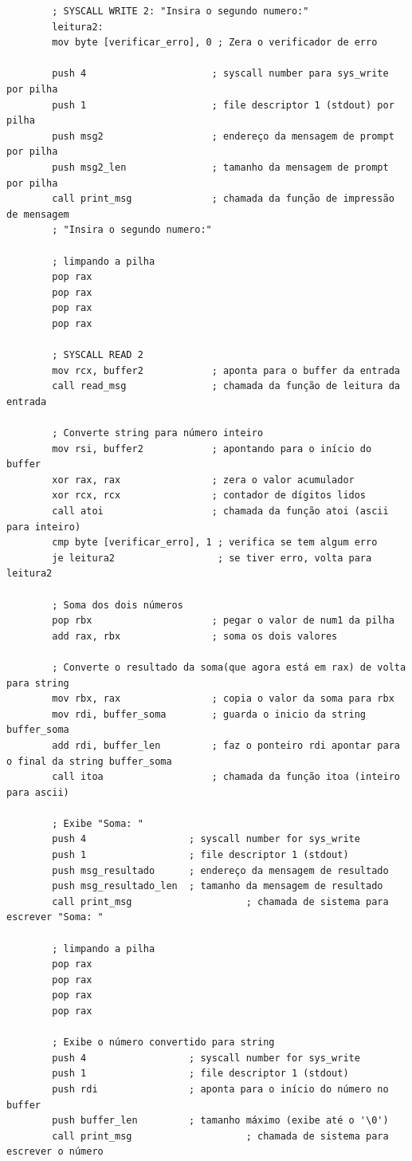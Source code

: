\documentclass[12pt, openany, oneside, a4paper, brazil]{abntex2}
\begin{document}
\begin{verbatim}
		; SYSCALL WRITE 2: "Insira o segundo numero:"
		leitura2:
		mov byte [verificar_erro], 0 ; Zera o verificador de erro
		
		push 4                      ; syscall number para sys_write por pilha
		push 1                      ; file descriptor 1 (stdout) por pilha
		push msg2                   ; endereço da mensagem de prompt por pilha
		push msg2_len               ; tamanho da mensagem de prompt por pilha
		call print_msg              ; chamada da função de impressão de mensagem
		; "Insira o segundo numero:"
		
		; limpando a pilha
		pop rax
		pop rax
		pop rax
		pop rax
		
		; SYSCALL READ 2
		mov rcx, buffer2            ; aponta para o buffer da entrada
		call read_msg               ; chamada da função de leitura da entrada
		
		; Converte string para número inteiro
		mov rsi, buffer2            ; apontando para o início do buffer
		xor rax, rax                ; zera o valor acumulador
		xor rcx, rcx                ; contador de dígitos lidos
		call atoi                   ; chamada da função atoi (ascii para inteiro)
		cmp byte [verificar_erro], 1 ; verifica se tem algum erro
		je leitura2                  ; se tiver erro, volta para leitura2
		
		; Soma dos dois números
		pop rbx                     ; pegar o valor de num1 da pilha
		add rax, rbx                ; soma os dois valores
		
		; Converte o resultado da soma(que agora está em rax) de volta para string
		mov rbx, rax                ; copia o valor da soma para rbx
		mov rdi, buffer_soma        ; guarda o inicio da string buffer_soma
		add rdi, buffer_len         ; faz o ponteiro rdi apontar para o final da string buffer_soma
		call itoa                   ; chamada da função itoa (inteiro para ascii)
		
		; Exibe "Soma: "
		push 4                  ; syscall number for sys_write
		push 1                  ; file descriptor 1 (stdout)
		push msg_resultado      ; endereço da mensagem de resultado
		push msg_resultado_len  ; tamanho da mensagem de resultado
		call print_msg                    ; chamada de sistema para escrever "Soma: "
		
		; limpando a pilha
		pop rax
		pop rax
		pop rax
		pop rax
		
		; Exibe o número convertido para string
		push 4                  ; syscall number for sys_write
		push 1                  ; file descriptor 1 (stdout)
		push rdi                ; aponta para o início do número no buffer
		push buffer_len         ; tamanho máximo (exibe até o '\0')
		call print_msg                    ; chamada de sistema para escrever o número
		

\end{verbatim}
\end{document}
